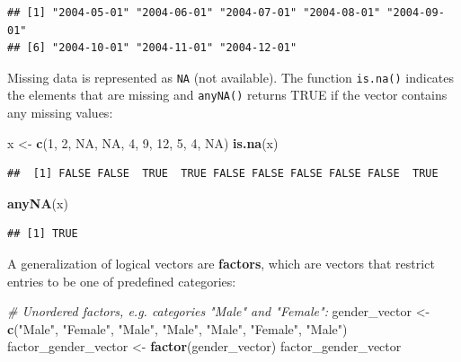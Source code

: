 \documentclass[
]{book}
\newenvironment{Shaded}{\begin{snugshade}}{\end{snugshade}}
\newcommand{\CommentTok}[1]{\textcolor[rgb]{0.56,0.35,0.01}{\textit{#1}}}
\newcommand{\ConstantTok}[1]{\textcolor[rgb]{0.56,0.35,0.01}{#1}}
\newcommand{\DecValTok}[1]{\textcolor[rgb]{0.00,0.00,0.81}{#1}}
\newcommand{\FunctionTok}[1]{\textcolor[rgb]{0.13,0.29,0.53}{\textbf{#1}}}
\newcommand{\NormalTok}[1]{#1}
\newcommand{\OtherTok}[1]{\textcolor[rgb]{0.56,0.35,0.01}{#1}}
\newcommand{\StringTok}[1]{\textcolor[rgb]{0.31,0.60,0.02}{#1}}
\begin{document}
\begin{verbatim}
## [1] "2004-05-01" "2004-06-01" "2004-07-01" "2004-08-01" "2004-09-01"
## [6] "2004-10-01" "2004-11-01" "2004-12-01"
\end{verbatim}

Missing data is represented as \texttt{NA} (not available). The function \texttt{is.na()} indicates the elements that are missing and \texttt{anyNA()} returns TRUE if the vector contains any missing values:

\begin{Shaded}
\begin{Highlighting}[]
\NormalTok{x }\OtherTok{\textless{}{-}} \FunctionTok{c}\NormalTok{(}\DecValTok{1}\NormalTok{, }\DecValTok{2}\NormalTok{, }\ConstantTok{NA}\NormalTok{, }\ConstantTok{NA}\NormalTok{, }\DecValTok{4}\NormalTok{, }\DecValTok{9}\NormalTok{, }\DecValTok{12}\NormalTok{, }\DecValTok{5}\NormalTok{, }\DecValTok{4}\NormalTok{, }\ConstantTok{NA}\NormalTok{)}
\FunctionTok{is.na}\NormalTok{(x)}
\end{Highlighting}
\end{Shaded}

\begin{verbatim}
##  [1] FALSE FALSE  TRUE  TRUE FALSE FALSE FALSE FALSE FALSE  TRUE
\end{verbatim}

\begin{Shaded}
\begin{Highlighting}[]
\FunctionTok{anyNA}\NormalTok{(x)}
\end{Highlighting}
\end{Shaded}

\begin{verbatim}
## [1] TRUE
\end{verbatim}

A generalization of logical vectors are \textbf{factors}, which are vectors that restrict entries to be one of predefined categories:

\begin{Shaded}
\begin{Highlighting}[]
\CommentTok{\# Unordered factors, e.g. categories "Male" and "Female":}
\NormalTok{gender\_vector }\OtherTok{\textless{}{-}} \FunctionTok{c}\NormalTok{(}\StringTok{"Male"}\NormalTok{, }\StringTok{"Female"}\NormalTok{, }\StringTok{"Male"}\NormalTok{, }\StringTok{"Male"}\NormalTok{, }\StringTok{"Male"}\NormalTok{, }\StringTok{"Female"}\NormalTok{, }\StringTok{"Male"}\NormalTok{)}
\NormalTok{factor\_gender\_vector }\OtherTok{\textless{}{-}} \FunctionTok{factor}\NormalTok{(gender\_vector)}
\NormalTok{factor\_gender\_vector}
\end{Highlighting}
\end{Shaded}
\end{document}
